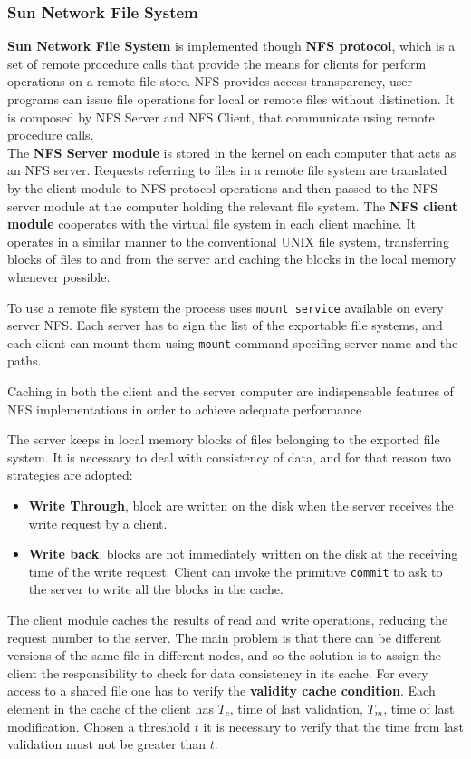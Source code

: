 \subsubsection{Sun Network File System}
\textbf{Sun Network File System} is implemented though \textbf{NFS protocol}, which is a set of remote procedure calls that provide the means for clients for perform operations on a remote file store. NFS provides access transparency, user programs can issue file operations for local or remote files without distinction. It is composed by NFS Server and NFS Client, that communicate using remote procedure calls.\\
The \textbf{NFS Server module} is stored in the kernel on each computer that acts as an NFS server. Requests referring to files in a remote file system are translated by the client module to NFS protocol operations and then passed to the NFS server module at the computer holding the relevant file system.
The \textbf{NFS client module} cooperates with the virtual file system in each client machine. It operates in a similar manner to the conventional UNIX file system, transferring blocks of files to and from the server and caching the blocks in the local memory whenever possible.\\

To use a remote file system the process uses \verb|mount service| available on every server NFS. Each server has to sign the list of the exportable file systems, and each client can mount them using \verb|mount| command specifing server name and the paths.

Caching in both the client and the server computer are indispensable features of NFS implementations in order to achieve adequate performance

The server keeps in local memory blocks of files belonging to the exported file system. It is necessary to deal with consistency of data, and for that reason two strategies are adopted:
\begin{itemize}
	\item \textbf{Write Through}, block are written on the disk when the server receives the write request by a client.
	\item \textbf{Write back}, blocks are not immediately written on the disk at the receiving time of the write request. Client can invoke the primitive \verb|commit| to ask to the server to write all the blocks in the cache.
\end{itemize}
The client module caches the results of read and write operations, reducing the request number to the server. The main problem is that there can be different versions of the same file in different nodes, and so the solution is to assign the client the responsibility to check for data consistency in its cache. For every access to a shared file one has to verify the \textbf{validity cache condition}. Each element in the cache of the client has $T_c$, time of last validation, $T_m$, time of last modification. Chosen a threshold $t$ it is necessary to verify that the time from last validation must not be greater than $t$.


